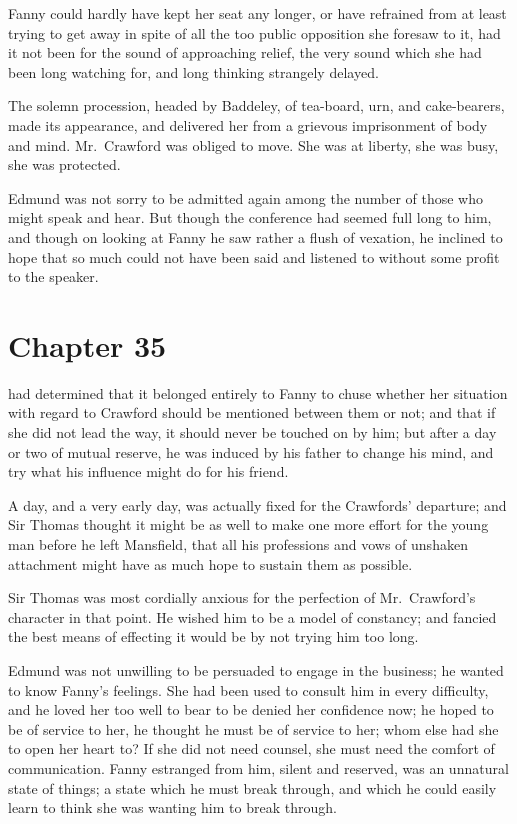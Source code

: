 Fanny could hardly have kept her seat any longer,
or have refrained from at least trying to get away in
spite of all the too public opposition she foresaw to it,
had it not been for the sound of approaching relief,
the very sound which she had been long watching for,
and long thinking strangely delayed.

The solemn procession, headed by Baddeley, of tea-board, urn,
and cake-bearers, made its appearance, and delivered
her from a grievous imprisonment of body and mind.
Mr.\ Crawford was obliged to move.  She was at liberty,
she was busy, she was protected.

Edmund was not sorry to be admitted again among the
number of those who might speak and hear.  But though
the conference had seemed full long to him, and though
on looking at Fanny he saw rather a flush of vexation,
he inclined to hope that so much could not have been
said and listened to without some profit to the speaker.



\chapter{Chapter 35}

 had determined that it belonged entirely to Fanny
to chuse whether her situation with regard to Crawford
should be mentioned between them or not; and that if she
did not lead the way, it should never be touched on by him;
but after a day or two of mutual reserve, he was induced
by his father to change his mind, and try what his influence
might do for his friend.

A day, and a very early day, was actually fixed for
the Crawfords' departure; and Sir Thomas thought it
might be as well to make one more effort for the young
man before he left Mansfield, that all his professions
and vows of unshaken attachment might have as much
hope to sustain them as possible.

Sir Thomas was most cordially anxious for the perfection
of Mr.\ Crawford's character in that point.  He wished him
to be a model of constancy; and fancied the best means
of effecting it would be by not trying him too long.

Edmund was not unwilling to be persuaded to engage
in the business; he wanted to know Fanny's feelings.
She had been used to consult him in every difficulty,
and he loved her too well to bear to be denied her
confidence now; he hoped to be of service to her, he thought
he must be of service to her; whom else had she to open
her heart to?  If she did not need counsel, she must need
the comfort of communication.  Fanny estranged from him,
silent and reserved, was an unnatural state of things;
a state which he must break through, and which he could
easily learn to think she was wanting him to break through.

